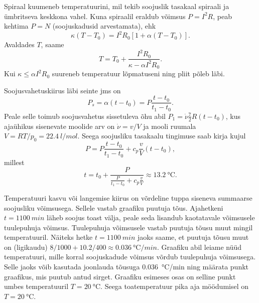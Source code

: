 \documentclass[10pt, twoside]{article}
\begin{document}
{%

\solu
Spiraal kuumeneb temperatuurini, mil tekib soojuslik tasakaal spiraali ja ümbritseva keskkona vahel. Kuna spiraalil eraldub võimsus $P = I^2R$, peab kehtima $P = N$ (soojuskadusid arvestamata), ehk
\[
\kappa\left(T-T_{0}\right)=I^{2} R_{0}\left[1+\alpha\left(T-T_{0}\right)\right].
\]
Avaldades $T$, saame
\[
T=T_{0}+\frac{I^{2} R_{0}}{\kappa-\alpha I^{2} R_{0}}.
\]
Kui $\kappa \leq \alpha I^2R_0$ suureneb temperatuur lõpmatuseni ning pliit põleb läbi.
\probend
\bigskip


\solu
Soojusvahetuskiirus läbi seinte jms on $$P_s=\alpha (t-t_0)=P\frac{t-t_0}{t_1-t_0}.$$
Peale selle toimub soojusvahetus sissetuleva õhu abil
$P_1=\dot\nu \frac 72 R (t-t_0)$, kus ajaühikus sisenevate moolide arv on $\dot\nu=v/V$ ja mooli ruumala $V=RT/p_0=\SI{22,4}{l/mol}$.
Seega soojusliku tasakaalu tingimuse saab kirja kujul
$$P= P\frac{t-t_0}{t_1-t_0} + c_p\frac vV(t-t_0),$$
millest $$t=t_0+\frac{P}{\frac{P}{t_1-t_0}+c_p\frac{v}{V}}
\approx \SI{13,2}{\degreeCelsius}.$$
\probend
\bigskip


\solu
Temperatuuri kasvu või langemise kiirus on võrdeline tuppa siseneva summaarse soojusliku võimsusega. Sellele vastab graafiku puutuja tõus. Ajahetkeni $t = \SI{1100}{min}$ läheb soojus toast välja, peale seda lisandub kaotatavale võimsusele tuulepuhuja võimsus. Tuulepuhuja võimsusele vastab puutuja tõusu muut mingil temperatuuril. Näiteks hetke $t = \SI{1100}{min}$ jaoks saame, et puutuja tõusu muut on (ligikaudu) $8/1000 + \num{10,2}/400 \approx \SI{0,036}{\degreeCelsius/min}$. Graafiku abil leiame nüüd temperatuuri, mille korral soojuskadude võimsus võrdub tuulepuhuja võimsusega. Selle jaoks võib kasutada joonlauda tõusuga \SI{0,036}{\degreeCelsius/min} ning määrata punkt graafikus, mis puutub antud sirget. Graafiku esimeses osas on selline punkt umbes temperatuuril $T = \SI{20}{\degreeCelsius}$. Seega toatemperatuur pika aja möödumisel on $T = \SI{20}{\degreeCelsius}$.
\probend
\bigskip


}
\end{document}
